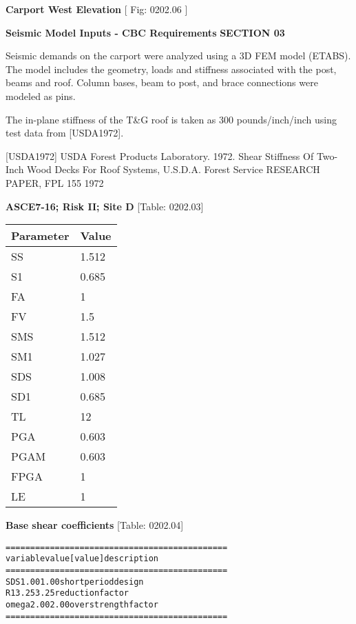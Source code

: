 \documentclass[12pt,notitle,letterpaper]{report}
\renewenvironment{quote}
  {\small\list{}{\rightmargin=0cm \leftmargin=0cm}%
   \item\relax}
  {\endlist}
\begin{document}
\textbf{Carport West Elevation} \hfill {[} Fig: 0202.06 {]}

\vspace{.2in}   \textbf{Seismic Model Inputs - CBC Requirements}   \hfill\textbf{SECTION 03}
\newline   \vspace{.05in}   {\color{black}\hrulefill}

Seismic demands on the carport were analyzed using a 3D FEM model (ETABS).
The model includes the geometry, loads and stiffness associated with the
post, beams and roof. Column bases, beam to post, and brace connections
were modeled as pins.

The in-plane stiffness of the T\&G roof is taken as 300 pounds/inch/inch
using test data from {[}USDA1972{]}.

{[}USDA1972{]} USDA Forest Products Laboratory. 1972. \textquotedbl{}Shear Stiffness Of Two-Inch
Wood Decks For Roof Systems\textquotedbl{}, U.S.D.A. Forest  Service RESEARCH  PAPER,
FPL 155 1972

\textbf{ASCE7-16; Risk II; Site D} \hfill  {[}Table: 0202.03{]}

\begin{tabulary}{1.0\textwidth}{LL}
\hline
 Parameter   &    Value \\
\hline
 SS          &    1.512 \\
 S1          &    0.685 \\
 FA          &    1     \\
 FV          &    1.5   \\
 SMS         &    1.512 \\
 SM1         &    1.027 \\
 SDS         &    1.008 \\
 SD1         &    0.685 \\
 TL          &   12     \\
 PGA         &    0.603 \\
 PGAM        &    0.603 \\
 FPGA        &    1     \\
 LE          &    1     \\
\hline
\end{tabulary}
\vspace{.15in}

\textbf{Base shear coefficients} \hfill  {[}Table: 0202.04{]}

\begin{quote}
\begin{alltt}
==========  =======  =========  ===================
variable      value    [value]  description
==========  =======  =========  ===================
SDS            1.00       1.00  short period design
R1             3.25       3.25  reduction factor
omega          2.00       2.00  overstrength factor
==========  =======  =========  ===================
\end{alltt}
\end{quote}
\end{document}

